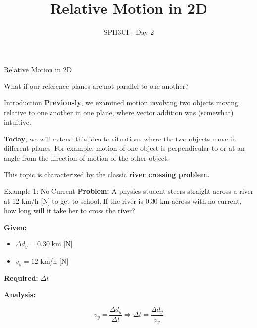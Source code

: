 \documentclass{beamer}
\title{Relative Motion in 2D}
\subtitle{SPH3UI - Day 2}
\author{}
\date{}
\begin{document}
\begin{frame}
\titlepage
\end{frame}

\begin{frame}{Relative Motion in 2D}
\begin{center}
\Large What if our reference planes are not parallel to one another?
\end{center}
\end{frame}

\begin{frame}{Introduction}
\textbf{Previously}, we examined motion involving two objects moving relative to one another in one plane, where vector addition was (somewhat) intuitive.
 
\vspace{0.5cm}

\textbf{Today}, we will extend this idea to situations where the two objects move in different planes. For example, motion of one object is perpendicular to or at an angle from the direction of motion of the other object.
 
\vspace{0.5cm}

This topic is characterized by the classic \textbf{river crossing problem.}
\end{frame}

\begin{frame}{Example 1: No Current}
\textbf{Problem:} A physics student steers straight across a river at 12 km/h [N] to get to school. If the river is 0.30 km across with no current, how long will it take her to cross the river?
 
\vspace{0.3cm}

\textbf{Given:} 
\begin{itemize}
\item \(\Delta d_y = 0.30\) km [N]
\item \(v_y = 12\) km/h [N]
\end{itemize}
 

\textbf{Required:} \(\Delta t\)
 

\vspace{0.3cm}

\textbf{Analysis:} 
 
\[v_y = \frac{\Delta d_y}{\Delta t} \Rightarrow \Delta t = \frac{\Delta d_y}{v_y}\]
\end{frame}
\end{document}
